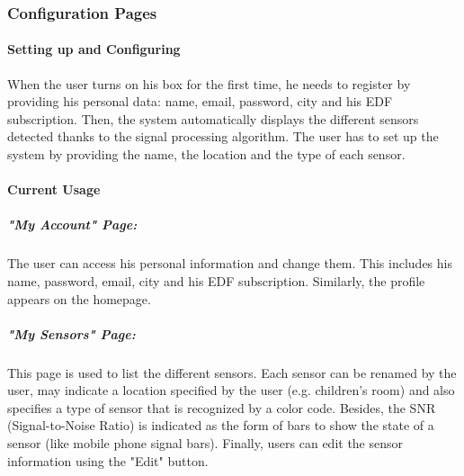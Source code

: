 \subsubsection{Configuration Pages}
    
    \paragraph{Setting up and Configuring} %
    
    When the user turns on his box for the first time, he needs to register by providing his personal data: name, email, password, city and his EDF subscription. Then, the system automatically displays the different sensors detected thanks to the signal processing algorithm. The user has to set up the system by providing the name, the location and the type of each sensor. %
    
    \paragraph{Current Usage} %
    
    \subparagraph{"My Account" Page:} 
    The user can access his personal information and change them. This includes his name, password, email, city and his EDF subscription. Similarly, the profile appears on the homepage.
    
    \subparagraph{"My Sensors" Page:}
    This page is used to list the different sensors. Each sensor can be renamed by the user, may indicate a location specified by the user (e.g. children's room) and also specifies a type of sensor that is recognized by a color code. Besides, the SNR (Signal-to-Noise Ratio) is indicated as the form of bars to show the state of a sensor (like mobile phone signal bars). Finally, users can edit the sensor information using the "Edit" button.